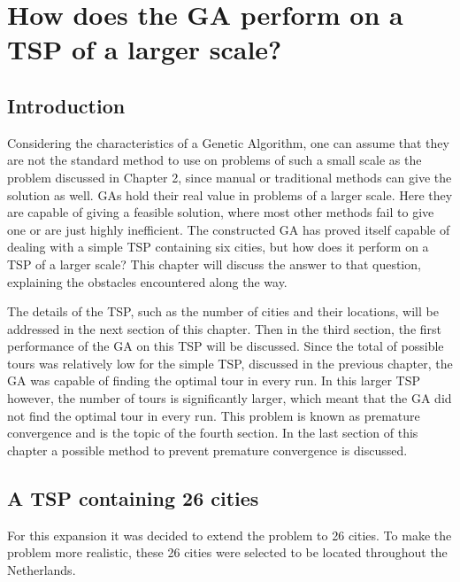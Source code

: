 \chapter{How does the GA perform on a TSP of a larger scale?}


\section{Introduction} %
\par
Considering the characteristics of a Genetic Algorithm, one can assume that they are not the standard method to use on problems of such a small scale as the problem discussed in Chapter 2, since manual or traditional methods can give the solution as well. GAs hold their real value in problems of a larger scale. Here they are capable of giving a feasible solution, where most other methods fail to give one or are just highly inefficient. The constructed GA has proved itself capable of dealing with a simple TSP containing six cities, but how does it perform on a TSP of a larger scale? This chapter will discuss the answer to that question, explaining the obstacles encountered along the way.
\par
The details of the TSP, such as the number of cities and their locations, will be addressed in the next section of this chapter. Then in the third section, the first performance of the GA on this TSP will be discussed. Since the total of possible tours was relatively low for the simple TSP, discussed in the previous chapter, the GA was capable of finding the optimal tour in every run. In this larger TSP however, the number of tours is significantly larger, which meant that the GA did not find the optimal tour in every run. This problem is known as premature convergence and is the topic of the fourth section. In the last section of this chapter a possible method to prevent premature convergence is discussed.

\section{A TSP containing 26 cities} %
For this expansion it was decided to extend the problem to 26 cities. To make the problem more realistic, these 26 cities were selected to be located throughout the Netherlands. 

